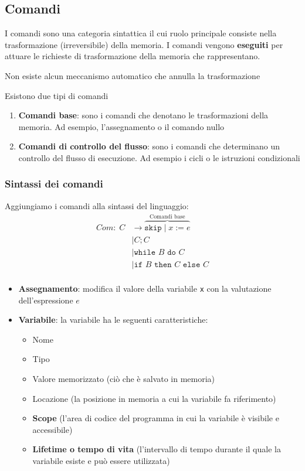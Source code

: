 \documentclass[a4paper]{article}
\begin{document}
\subsection{Comandi}
I comandi sono una categoria sintattica il cui ruolo principale consiste nella
trasformazione (irreversibile) della memoria. I comandi vengono \textbf{eseguiti} per attuare
le richieste di trasformazione della memoria che rappresentano.

\begin{define}[Reversibilità]
  Non esiste alcun meccanismo automatico che annulla la trasformazione
\end{define}

\noindent
Esistono due tipi di comandi
\begin{enumerate}
  \item \textbf{Comandi base}: sono i comandi che denotano le trasformazioni della
    memoria. Ad esempio, l'assegnamento o il comando nullo

  \item \textbf{Comandi di controllo del flusso}:
    sono i comandi che determinano un controllo del flusso di esecuzione.
    Ad esempio i cicli o le istruzioni condizionali
\end{enumerate}

\subsubsection{Sintassi dei comandi}
Aggiungiamo i comandi alla sintassi del linguaggio:
\[
  \begin{aligned}
    Com: \; C & \to \overbrace{
      \texttt{skip} \mid x := e 
    }^{\text{Comandi base}} \\
                      & \mid C; C  \\
                      & \mid \texttt{while } B \texttt{ do } C \\
                      & \mid \texttt{if } B \texttt{ then } C \texttt{ else } C  \\
  \end{aligned}
\] 
\begin{itemize}
  \item \textbf{Assegnamento}: modifica il valore della variabile \texttt{x} con la
    valutazione dell'espressione \( e \)

  \item \textbf{Variabile}: la variabile ha le seguenti caratteristiche:
    \begin{itemize}
      \item Nome
      \item Tipo
      \item Valore memorizzato (ciò che è salvato in memoria)
      \item Locazione (la posizione in memoria a cui la variabile fa riferimento)
      \item \textbf{Scope} (l'area di codice del programma in cui la variabile è
        visibile e accessibile)
      \item \textbf{Lifetime o tempo di vita} (l'intervallo di tempo durante
        il quale la variabile esiste e può essere utilizzata)
    \end{itemize}
\end{itemize}
\end{document}
